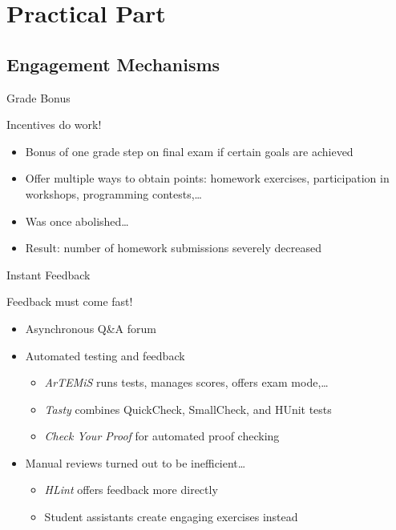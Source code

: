 \documentclass{beamer}
\begin{document}
\section{Practical Part}
\subsection{Engagement Mechanisms}
\begin{frame}{Grade Bonus}
\centerline{\Large{\alert{Incentives do work!}}}
\pause
\begin{itemize}[<+->]
\item Bonus of one grade step on final exam if certain goals are achieved
\item Offer multiple ways to obtain points: homework exercises, participation in workshops, programming contests,\dots
\item Was once abolished\dots\\
\item[] Result: number of homework submissions severely decreased
\end{itemize}
\end{frame}

\begin{frame}{Instant Feedback}
\centerline{\Large{\alert{Feedback must come fast!}}}
\pause
\begin{itemize}[<+->]
\item Asynchronous Q\&A forum
\item Automated testing and feedback
\begin{itemize}
  \item \emph{ArTEMiS} runs tests, manages scores, offers exam mode,\dots
  \item \emph{Tasty} combines QuickCheck, SmallCheck, and HUnit tests
  \item \emph{Check Your Proof} for automated proof checking
\end{itemize}
\item Manual reviews turned out to be inefficient\dots
\begin{itemize}
  \item \emph{HLint} offers feedback more directly
  \item Student assistants create engaging exercises instead
\end{itemize}
\end{itemize}
\end{frame}
\end{document}
